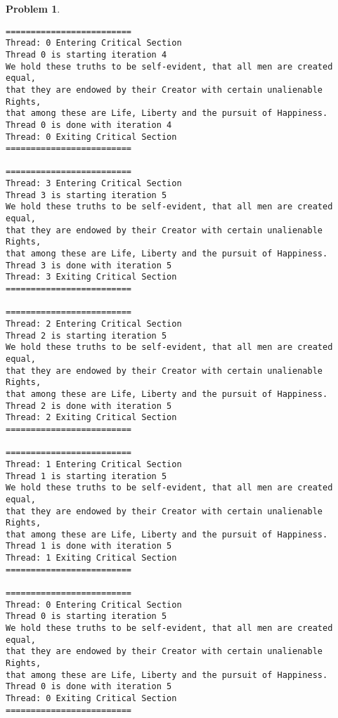 \documentclass{article}
\theoremstyle{problemstyle}
\newtheorem{problem}{Problem}
\begin{document}
\begin{problem}
\begin{enumerate}[label=(\alph*)]
\begin{lstlisting}
=========================
Thread: 0 Entering Critical Section
Thread 0 is starting iteration 4
We hold these truths to be self-evident, that all men are created equal,
that they are endowed by their Creator with certain unalienable Rights,
that among these are Life, Liberty and the pursuit of Happiness.
Thread 0 is done with iteration 4
Thread: 0 Exiting Critical Section
=========================

=========================
Thread: 3 Entering Critical Section
Thread 3 is starting iteration 5
We hold these truths to be self-evident, that all men are created equal,
that they are endowed by their Creator with certain unalienable Rights,
that among these are Life, Liberty and the pursuit of Happiness.
Thread 3 is done with iteration 5
Thread: 3 Exiting Critical Section
=========================

=========================
Thread: 2 Entering Critical Section
Thread 2 is starting iteration 5
We hold these truths to be self-evident, that all men are created equal,
that they are endowed by their Creator with certain unalienable Rights,
that among these are Life, Liberty and the pursuit of Happiness.
Thread 2 is done with iteration 5
Thread: 2 Exiting Critical Section
=========================

=========================
Thread: 1 Entering Critical Section
Thread 1 is starting iteration 5
We hold these truths to be self-evident, that all men are created equal,
that they are endowed by their Creator with certain unalienable Rights,
that among these are Life, Liberty and the pursuit of Happiness.
Thread 1 is done with iteration 5
Thread: 1 Exiting Critical Section
=========================

=========================
Thread: 0 Entering Critical Section
Thread 0 is starting iteration 5
We hold these truths to be self-evident, that all men are created equal,
that they are endowed by their Creator with certain unalienable Rights,
that among these are Life, Liberty and the pursuit of Happiness.
Thread 0 is done with iteration 5
Thread: 0 Exiting Critical Section
=========================	
\end{lstlisting}
\end{enumerate}
\end{problem}
\end{document}
